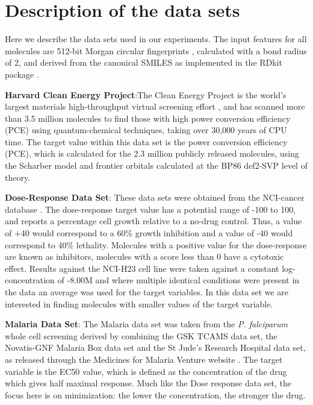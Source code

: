 \section{Description of the data sets}\label{sec:data_sets}

Here we describe the data sets used in our experiments. The input features for all molecules are 512-bit Morgan circular fingerprints \cite{Rogers_2010}, calculated with a bond radius of 2, and derived from the canonical SMILES as implemented in the RDkit package \cite{rdkit}.

\textbf{Harvard Clean Energy Project}:The Clean Energy Project is the world's largest materials high-throughput virtual screening effort \cite{Hachmann_2014,Hachmann_2011}, and has scanned more than 3.5 million molecules to find those with high power conversion efficiency (PCE) using quantum-chemical techniques, taking over 30,000 years of CPU time. The target value within this data set is the power conversion efficiency (PCE), which is calculated for the 2.3 million publicly released molecules, using the Scharber model \cite{Dennler_2008} and frontier orbitals calculated at the BP86 \cite{Perdew_1986,Becke_1993} \/ def2-SVP \cite{Weigend_2005} level of theory.

\textbf{Dose-Response Data Set}: These data sets were obtained from the NCI-cancer database \cite{_nci_}.  The dose-response target value has a potential range of -100 to 100, and reports a percentage cell growth relative to a no-drug control.  Thus, a value of +40 would correspond to a 60\% growth inhibition and a value of -40 would correspond to 40\% lethality.  Molecules with a positive value for the dose-response are known as inhibitors, molecules with a score less than 0 have a cytotoxic effect. Results against the NCI-H23 cell line were taken against a constant log-concentration of -8.00M and where multiple identical conditions were present in the data an average was used for the target variables. In this data set we are interested in finding molecules with  smaller values of the target variable.

\textbf{Malaria Data Set}: The Malaria data set was taken from the \textit{P. falciparum} whole cell screening derived by combining the GSK TCAMS data set, the Novatis-GNF Malaria Box data set and the St Jude's Research Hospital data set, as released through the Medicines for Malaria Venture website \cite{Spangenberg_2013}. The target variable is the EC50 value, which is defined as the concentration of the drug which gives half maximal response. Much like the Dose response data set, the focus here is on minimization: the lower the concentration, the stronger the drug.
